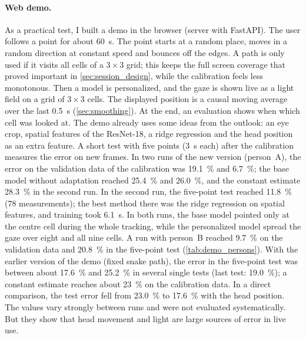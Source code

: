 \paragraph{Web demo.}
As a practical test, I built a demo in the browser (server with FastAPI). The
user follows a point for about \SI{60}{\second}. The point starts at a random
place, moves in a random direction at constant speed and bounces off the
edges. A path is only used if it visits all cells of a $3\times3$ grid; this
keeps the full screen coverage that proved important in
\cref{sec:session_design}, while the calibration feels less monotonous. Then a
model is personalized, and the gaze is shown live as a light field on a grid of
$3\times3$ cells. The displayed position is a causal moving average over the
last \SI{0.5}{\second} (\cref{sec:smoothing}). At the end, an evaluation shows
when which cell was looked at. The demo already uses some ideas from the
outlook: an eye crop, spatial features of the ResNet-18, a ridge regression and
the head position as an extra feature. A short test with five points
(\SI{3}{\second} each) after the calibration measures the error on new frames.
In two runs of the new version (person~A), the error on the
validation data of the calibration was \SI{19.1}{\percent} and
\SI{6.7}{\percent}; the base model without adaptation reached
\SI{25.4}{\percent} and \SI{26.0}{\percent}, and the constant estimate
\SI{28.3}{\percent} in the second run. In the second run, the five-point test
reached \SI{11.8}{\percent} (78 measurements); the best method there was the
ridge regression on spatial features, and training took \SI{6.1}{\second}. In
both runs, the base model pointed only at the centre cell during the whole
tracking, while the personalized model spread the gaze over eight and all nine
cells. A run with person~B reached \SI{9.7}{\percent} on the validation data
and \SI{20.8}{\percent} in the five-point test (\cref{tab:demo_persons}). With the earlier version of the demo (fixed snake
path), the error in the five-point test was between about \SI{17.6}{\percent} and
\SI{25.2}{\percent} in several single tests (last test: \SI{19.0}{\percent});
a constant estimate reaches about \SI{23}{\percent} on the calibration data. In
a direct comparison, the test error fell from \SI{23.0}{\percent} to
\SI{17.6}{\percent} with the head position. The values vary strongly between
runs and were not evaluated systematically. But they show that head movement
and light are large sources of error in live use.
